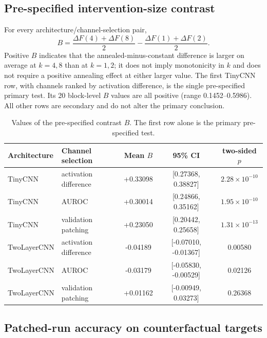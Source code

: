 \subsection{Pre-specified intervention-size contrast}\label{app:prospective-contrast}

For every architecture/channel-selection pair,
\begin{equation}
\label{eq:app-channel-count-contrast}
B=\frac{\Delta F(4)+\Delta F(8)}{2}-\frac{\Delta F(1)+\Delta F(2)}{2}.
\end{equation}
Positive $B$ indicates that the annealed-minus-constant difference is larger on average at $k=4,8$ than at $k=1,2$; it does not imply monotonicity in $k$ and does not require a positive annealing effect at either larger value. The first TinyCNN row, with channels ranked by activation difference, is the single pre-specified primary test. Its 20 block-level $B$ values are all positive (range 0.1452--0.5986). All other rows are secondary and do not alter the primary conclusion.

\begin{table}[h]
\caption{Values of the pre-specified contrast $B$. The first row alone is the primary pre-specified test.}
\label{tab:prospective-contrast}
\centering
\small
\begin{tabular}{llccc}
\toprule
Architecture & Channel selection & Mean $B$ & 95\% CI & two-sided $p$ \\
\midrule
TinyCNN & activation difference & +0.33098 & [0.27368, 0.38827] & $2.28\times10^{-10}$ \\
TinyCNN & AUROC & +0.30014 & [0.24866, 0.35162] & $1.95\times10^{-10}$ \\
TinyCNN & validation patching & +0.23050 & [0.20442, 0.25658] & $1.31\times10^{-13}$ \\
TwoLayerCNN & activation difference & -0.04189 & [-0.07010, -0.01367] & 0.00580 \\
TwoLayerCNN & AUROC & -0.03179 & [-0.05830, -0.00529] & 0.02126 \\
TwoLayerCNN & validation patching & +0.01162 & [-0.00949, 0.03273] & 0.26368 \\
\bottomrule
\end{tabular}
\end{table}

\subsection{Patched-run accuracy on counterfactual targets}\label{app:prospective-cf}

